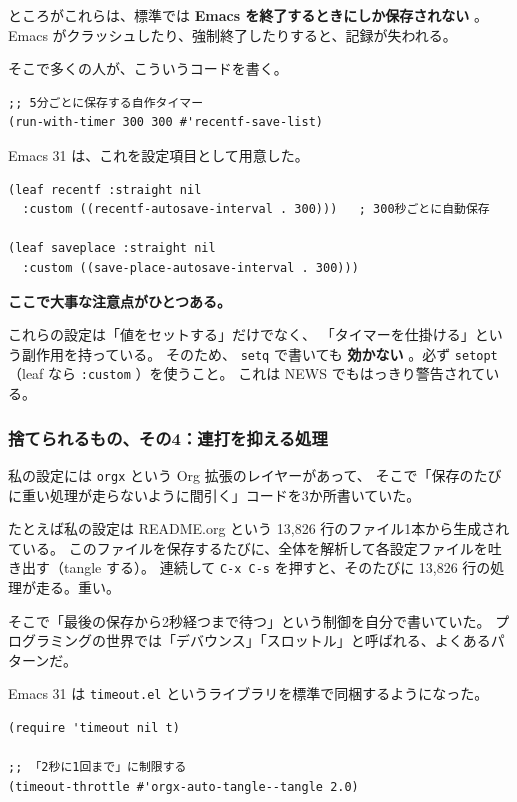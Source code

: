\documentclass[11pt]{article}
\begin{document}
ところがこれらは、標準では \textbf{Emacs を終了するときにしか保存されない} 。
Emacs がクラッシュしたり、強制終了したりすると、記録が失われる。

そこで多くの人が、こういうコードを書く。

\begin{verbatim}
;; 5分ごとに保存する自作タイマー
(run-with-timer 300 300 #'recentf-save-list)
\end{verbatim}

Emacs 31 は、これを設定項目として用意した。

\begin{verbatim}
(leaf recentf :straight nil
  :custom ((recentf-autosave-interval . 300)))   ; 300秒ごとに自動保存

(leaf saveplace :straight nil
  :custom ((save-place-autosave-interval . 300)))
\end{verbatim}

\textbf{ここで大事な注意点がひとつある。}

これらの設定は「値をセットする」だけでなく、
「タイマーを仕掛ける」という副作用を持っている。
そのため、 \texttt{setq} で書いても \textbf{効かない} 。必ず \texttt{setopt} （leaf なら \texttt{:custom} ）を使うこと。
これは NEWS でもはっきり警告されている。
\subsubsection{捨てられるもの、その4：連打を抑える処理}
\label{sec:org8f2a229}

私の設定には \texttt{orgx} という Org 拡張のレイヤーがあって、
そこで「保存のたびに重い処理が走らないように間引く」コードを3か所書いていた。

たとえば私の設定は README.org という 13,826 行のファイル1本から生成されている。
このファイルを保存するたびに、全体を解析して各設定ファイルを吐き出す（tangle する）。
連続して \texttt{C-x C-s} を押すと、そのたびに 13,826 行の処理が走る。重い。

そこで「最後の保存から2秒経つまで待つ」という制御を自分で書いていた。
プログラミングの世界では「デバウンス」「スロットル」と呼ばれる、よくあるパターンだ。

Emacs 31 は \texttt{timeout.el} というライブラリを標準で同梱するようになった。

\begin{verbatim}
(require 'timeout nil t)

;; 「2秒に1回まで」に制限する
(timeout-throttle #'orgx-auto-tangle--tangle 2.0)
\end{verbatim}
\end{document}
